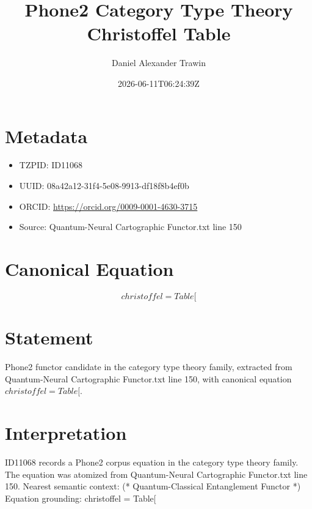 \documentclass[11pt]{article}
\title{Phone2 Category Type Theory Christoffel Table}
\author{Daniel Alexander Trawin}
\date{2026-06-11T06:24:39Z}
\begin{document}
\maketitle
\section*{Metadata}
\begin{itemize}
\item TZPID: ID11068
\item UUID: 08a42a12-31f4-5e08-9913-df18f8b4ef0b
\item ORCID: \url{https://orcid.org/0009-0001-4630-3715}
\item Source: Quantum-Neural Cartographic Functor.txt line 150
\end{itemize}
\section*{Canonical Equation}
\[
christoffel = Table[
\]
\section*{Statement}
Phone2 functor candidate in the category type theory family, extracted from Quantum-Neural Cartographic Functor.txt line 150, with canonical equation $christoffel = Table[$.
\section*{Interpretation}
ID11068 records a Phone2 corpus equation in the category type theory family. The equation was atomized from Quantum-Neural Cartographic Functor.txt line 150. Nearest semantic context: (* Quantum-Classical Entanglement Functor *) Equation grounding: christoffel = Table[
\end{document}
